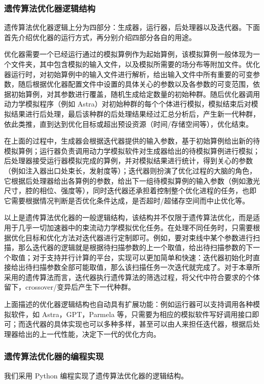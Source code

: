 \subsubsection{遗传算法优化器逻辑结构}
遗传算法优化器逻辑上分为四部分：生成器，运行器，后处理器以及迭代器。下面首先介绍优化器的运行方式，再分别介绍四部分各自的用途。

优化器需要一个已经运行通过的模拟算例作为起始算例，该模拟算例一般体现为一个文件夹，其中包含模拟的输入文件，以及模拟所需要的场分布等附加文件。优化器运行时，对初始算例中的输入文件进行解析，给出输入文件中所有重要的可变参数，随后根据优化器配置文件中设置的具体关心的参数以及各参数的可变范围，依据初始算例，对其参数进行覆盖，随机生成给定数量的初始种群。随后优化器调用动力学模拟程序（例如 Astra）对初始种群的每个个体进行模拟，模拟结束后对模拟结果进行后处理，最后该种群的后处理结果经过汇总分析后，产生新一代种群，依此类推，直到达到优化目标或超出预设资源（时间/存储空间等），优化结束。


在上面的过程中，生成器会根据迭代器提供的输入参数，基于初始算例给出新的待模拟算例；运行器负责调用动力学模拟软件对生成器给出的待模拟算例进行模拟；后处理器接受运行器模拟完成的算例，并对模拟结果进行统计，得到关心的参数（例如注入器出口处束长，发射度等）；迭代器则扮演了优化过程的大脑的角色，它根据后处理器给出各算例的参数，给出下一组待模拟算例的输入参数（例如激光尺寸，腔的相位、强度等），同时迭代器还承担着控制整个优化进程的任务，也即它需要根据情况判断是否优化条件达成，是否超时/超储存空间而中止优化等。

以上是遗传算法优化器的一般逻辑结构，该结构并不仅限于遗传算法优化，而是适用于几乎一切加速器中的束流动力学模拟优化任务。在处理不同任务时，只需要根据优化目标和优化方法对迭代器进行定制即可。例如，要对束线中某个参数进行扫描，那么迭代器的逻辑就是根据待扫描参数的上一个取值，给出待扫描参数的下一个取值；对于支持并行计算的平台，实现可以更加简单和快速：迭代器初始化时直接给出待扫描参数全部可能取值，那么该扫描任务一次迭代就完成了。对于本章所采用的遗传算法而言，迭代器执行遗传算法的筛选过程，将父代中符合要求的个体留下，crossover/变异后产生下一代种群。

上面描述的优化器逻辑结构也自动具有扩展功能：例如运行器可以支持调用各种模拟软件，如 Astra，GPT，Parmela 等，只需要为相应的模拟软件写好调用接口即可；而迭代器的具体实现也可以多种多样，甚至可以由人来担任迭代器，根据后处理器给出的上一代性能，决定下一代的优化方向。

\subsubsection{遗传算法优化器的编程实现}
我们采用 Python 编程实现了遗传算法优化器的逻辑结构。

